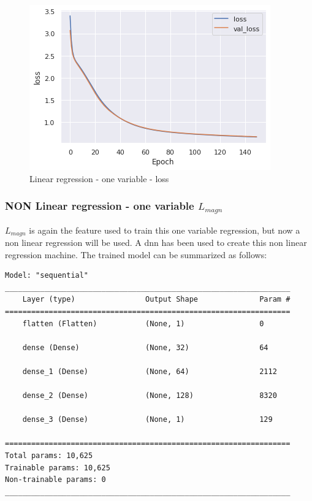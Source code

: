 \begin{figure}[H]
    \centering
    \includegraphics[width=.5\linewidth]{sections/images/section3/linear_multi_veariable.png}
    \caption{Linear regression - one variable - loss}
    \label{fig:linear_multi_veariable}
\end{figure}
\subsubsection{NON Linear regression - one variable \texorpdfstring{$L_{magn}$}{Lmagn}}
$L_{magn}$ is again the feature used to train this one variable regression, but now a non linear regression will be used.
A \gls{dnn} has been used to create this non linear regression machine.
The trained model can be summarized as follows:
\begin{lstlisting}[basicstyle=\ttfamily\footnotesize]
Model: "sequential"
_________________________________________________________________
    Layer (type)                Output Shape              Param #   
=================================================================
    flatten (Flatten)           (None, 1)                 0         
                                                                    
    dense (Dense)               (None, 32)                64        
                                                                    
    dense_1 (Dense)             (None, 64)                2112      
                                                                    
    dense_2 (Dense)             (None, 128)               8320      
                                                                    
    dense_3 (Dense)             (None, 1)                 129       
                                                                    
=================================================================
Total params: 10,625
Trainable params: 10,625
Non-trainable params: 0
_________________________________________________________________
\end{lstlisting}
